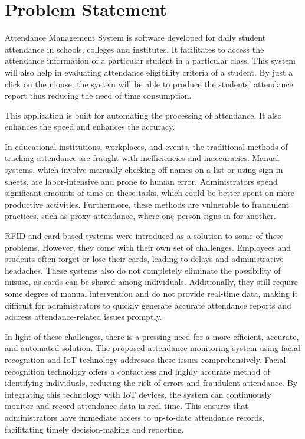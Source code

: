 \documentclass[12pt,a4paper]{report}
\begin{document}
\section{Problem Statement}
\par Attendance Management System is software developed for daily student attendance in schools, colleges and institutes. It facilitates to access the attendance information of a particular student in a particular class. This system will also help in evaluating attendance eligibility criteria of a student. By just a click on the mouse, the system will be able to produce the students' attendance report thus reducing the need of time consumption.\\
\par This application is built for automating the processing of attendance. It also enhances the speed and enhances the accuracy.\\
\par In educational institutions, workplaces, and events, the traditional methods of tracking attendance are fraught with inefficiencies and inaccuracies. Manual systems, which involve manually checking off names on a list or using sign-in sheets, are labor-intensive and prone to human error. Administrators spend significant amounts of time on these tasks, which could be better spent on more productive activities. Furthermore, these methods are vulnerable to fraudulent practices, such as proxy attendance, where one person signs in for another.\\
\par RFID and card-based systems were introduced as a solution to some of these problems. However, they come with their own set of challenges. Employees and students often forget or lose their cards, leading to delays and administrative headaches. These systems also do not completely eliminate the possibility of misuse, as cards can be shared among individuals. Additionally, they still require some degree of manual intervention and do not provide real-time data, making it difficult for administrators to quickly generate accurate attendance reports and address attendance-related issues promptly.\\
\par In light of these challenges, there is a pressing need for a more efficient, accurate, and automated solution. The proposed attendance monitoring system using facial recognition and IoT technology addresses these issues comprehensively. Facial recognition technology offers a contactless and highly accurate method of identifying individuals, reducing the risk of errors and fraudulent attendance. By integrating this technology with IoT devices, the system can continuously monitor and record attendance data in real-time. This ensures that administrators have immediate access to up-to-date attendance records, facilitating timely decision-making and reporting.\\
\end{document}
